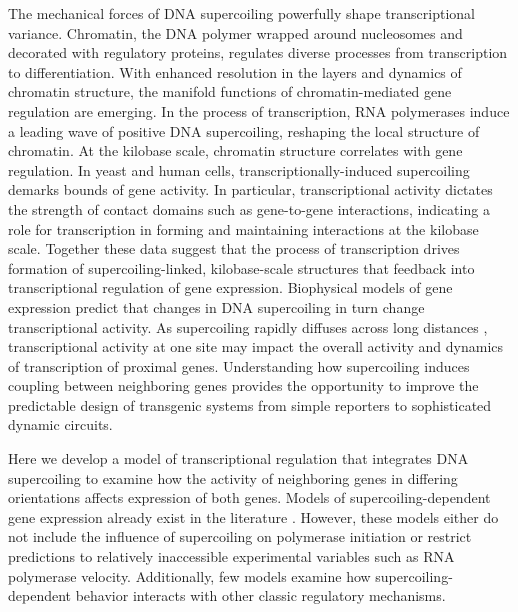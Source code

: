 \documentclass[11pt]{article}
\begin{document}
The mechanical forces of DNA supercoiling powerfully shape transcriptional variance.\parencite{desaiDNArepairPathwayCan2021,chongMechanismTranscriptionalBursting2014}
Chromatin, the DNA polymer wrapped around nucleosomes and decorated with regulatory proteins, regulates diverse processes from transcription to differentiation. With enhanced resolution in the layers and dynamics of chromatin structure, the manifold functions of chromatin-mediated gene regulation are emerging.\parencite{hsiehResolving3DLandscape2020,krietensteinUltrastructuralDetailsMammalian2020}
In the process of transcription, RNA polymerases induce a leading wave of positive DNA supercoiling\parencite{wuTranscriptionGeneratesPositively1988,liuSupercoilingDNATemplate1987}, reshaping the local structure of chromatin.\parencite{acharNegativeSupercoilGene2020,tevesTranscriptiongeneratedTorsionalStress2014,naughtonTranscriptionFormsRemodels2013,guoHighresolutionGenomewideMapping2021a}
At the kilobase scale, chromatin structure correlates with gene regulation.\parencite{hsiehResolving3DLandscape2020,rowleyEvolutionarilyConservedPrinciples2017}
In yeast and human cells, transcriptionally-induced supercoiling demarks bounds of gene activity.\parencite{acharNegativeSupercoilGene2020,naughtonTranscriptionFormsRemodels2013}
In particular, transcriptional activity dictates the strength of contact domains such as gene-to-gene interactions, indicating a role for transcription in forming and maintaining interactions at the kilobase scale.\parencite{rowleyOrganizationalPrinciples3D2018,rowleyEvolutionarilyConservedPrinciples2017}
Together these data suggest that the process of transcription drives formation of supercoiling-linked, kilobase-scale structures that feedback into transcriptional regulation of gene expression. Biophysical models of gene expression predict that changes in DNA supercoiling in turn change transcriptional activity.\parencite{sevierPropertiesGeneExpression2018}
As supercoiling rapidly diffuses across long distances \parencite{loenhoutDynamicsDNASupercoils2012}, transcriptional activity at one site may impact the overall activity and dynamics of transcription of proximal genes.\parencite{sevierCollectivePolymeraseDynamics2022,tripathiDNASupercoilingmediatedCollective2021}
Understanding how supercoiling induces coupling between neighboring genes provides the opportunity to improve the predictable design of transgenic systems from simple reporters to sophisticated dynamic circuits.

Here we develop a model of transcriptional regulation that integrates DNA supercoiling to examine how the activity of neighboring genes in differing orientations affects expression of both genes. Models of supercoiling-dependent gene expression already exist in the literature \parencite{sevierCollectivePolymeraseDynamics2022,tripathiDNASupercoilingmediatedCollective2021}. However, these models either do not include the influence of supercoiling on polymerase initiation or restrict predictions to relatively inaccessible experimental variables such as RNA polymerase velocity. Additionally, few models examine how supercoiling-dependent behavior interacts with other classic regulatory mechanisms.
\end{document}
